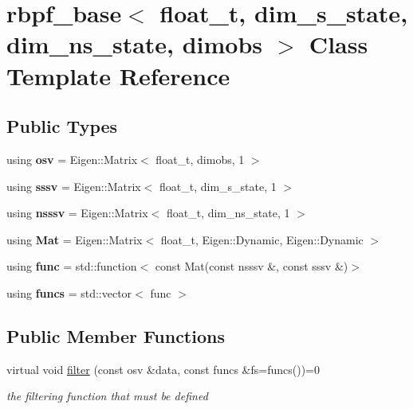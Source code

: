 \hypertarget{classrbpf__base}{}\section{rbpf\+\_\+base$<$ float\+\_\+t, dim\+\_\+s\+\_\+state, dim\+\_\+ns\+\_\+state, dimobs $>$ Class Template Reference}
\label{classrbpf__base}
\subsection*{Public Types}
\begin{DoxyCompactItemize}
\item 
\mbox{\label{classrbpf__base_a232936f9aba33d2cb3ec0a74d86ff673}} 
using {\bfseries osv} = Eigen\+::\+Matrix$<$ float\+\_\+t, dimobs, 1 $>$
\item 
\mbox{\label{classrbpf__base_ab2eccf330f9b74a01b4131ebf650fc45}} 
using {\bfseries sssv} = Eigen\+::\+Matrix$<$ float\+\_\+t, dim\+\_\+s\+\_\+state, 1 $>$
\item 
\mbox{\label{classrbpf__base_af80df010347845efac98659ecf7bb1f2}} 
using {\bfseries nsssv} = Eigen\+::\+Matrix$<$ float\+\_\+t, dim\+\_\+ns\+\_\+state, 1 $>$
\item 
\mbox{\label{classrbpf__base_a195c55dcd55fb4a1a5a08c44603bd683}} 
using {\bfseries Mat} = Eigen\+::\+Matrix$<$ float\+\_\+t, Eigen\+::\+Dynamic, Eigen\+::\+Dynamic $>$
\item 
\mbox{\label{classrbpf__base_ab97a27bf3704125176265f8cbb1ccb75}} 
using {\bfseries func} = std\+::function$<$ const Mat(const nsssv \&, const sssv \&)$>$
\item 
\mbox{\label{classrbpf__base_a5e2ffe0b6e10136fcac986314664f938}} 
using {\bfseries funcs} = std\+::vector$<$ func $>$
\end{DoxyCompactItemize}
\subsection*{Public Member Functions}
\begin{DoxyCompactItemize}
\item 
\mbox{\label{classrbpf__base_afe22a67962a28c83b8568b96f80e9c7b}} 
virtual void \hyperlink{classrbpf__base_afe22a67962a28c83b8568b96f80e9c7b}{filter} (const osv \&data, const funcs \&fs=funcs())=0
\begin{DoxyCompactList}\small\item\em the filtering function that must be defined \end{DoxyCompactList}\end{DoxyCompactItemize}
